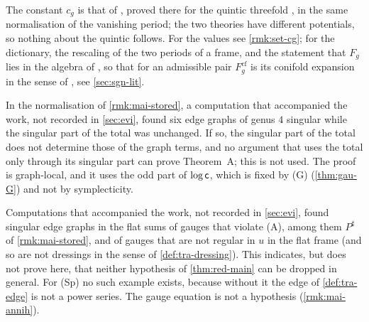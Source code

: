 \begin{rmk}
\label{rmk:mai-constant}
The constant $c_g$ is that of \cite[Conj.~1.5]{CGYZ26}, proved there for the quintic threefold \cite[Thm.~2]{CGYZ26}, in the same normalisation of the vanishing period; the two theories have different potentials, so nothing about the quintic follows. For the values see \cref{rmk:set-cg}; for the dictionary, the rescaling of the two periods of a frame, and the statement that $F_g$ lies in the algebra of \cite[Def.~1.1]{CGYZ26}, so that for an admissible pair $F_g^{\mathrm{cf}}$ is its conifold expansion in the sense of \cite[Def.~1.2]{CGYZ26}, see \cref{sec:sgn-lit}.
\end{rmk}

\begin{rmk}
\label{rmk:mai-graphlocal}
In the normalisation of \cref{rmk:mai-stored}, a computation that accompanied the work, not recorded in \cref{sec:evi}, found six edge graphs of genus $4$ singular while the singular part of the total was unchanged. If so, the singular part of the total does not determine those of the graph terms, and no argument that uses the total only through its singular part can prove Theorem~A; this is not used. The proof is graph-local, and it uses the odd part of $\log\mathsf{c}$, which is fixed by (G) (\cref{thm:gau-G}) and not by symplecticity.
\end{rmk}

\begin{rmk}
\label{rmk:mai-necessity}
Computations that accompanied the work, not recorded in \cref{sec:evi}, found singular edge graphs in the flat sums of gauges that violate (A), among them $P^\sharp$ of \cref{rmk:mai-stored}, and of gauges that are not regular in $u$ in the flat frame (and so are not dressings in the sense of \cref{def:tra-dressing}). This indicates, but does not prove here, that neither hypothesis of \cref{thm:red-main} can be dropped in general. For (Sp) no such example exists, because without it the edge of \cref{def:tra-edge} is not a power series. The gauge equation is not a hypothesis (\cref{rmk:mai-annih}).
\end{rmk}
